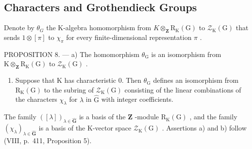 \subsection{Characters and Grothendieck Groups}

Denote by \(\theta_{G}\) the K-algebra homomorphism from \(K\otimes_{\mathbf{Z}}\mathrm{R}_{\mathrm{K}}(\mathrm{G})\) to \(\mathcal{Z}_{\mathrm{K}}(\mathrm{G})\) that sends \(1\otimes[\pi]\) to \(\chi_{\pi}\) for every finite-dimensional representation \(\pi\) .

PROPOSITION 8. --- a) The homomorphism \(\theta_{\mathrm{G}}\) is an isomorphism from \(\mathrm{K} \otimes_{\mathbf{Z}} \mathrm{R}_{\mathrm{K}}(\mathrm{G})\) to \(\mathcal{Z}_{\mathrm{K}}(\mathrm{G})\) .

\begin{enumerate}
\def\labelenumi{\alph{enumi})}
\setcounter{enumi}{1}
\tightlist
\item
  Suppose that K has characteristic 0. Then \(\theta_{\mathrm{G}}\) defines an isomorphism from \(\mathrm{R}_{\mathrm{K}}(\mathrm{G})\) to the subring of \(\mathcal{Z}_{\mathrm{K}}(\mathrm{G})\) consisting of the linear combinations of the characters \(\chi_{\lambda}\) for \(\lambda\) in \(\widehat{\mathrm{G}}\) with integer coefficients.
\end{enumerate}

The family \(([\lambda])_{\lambda \in \widehat{\mathbf{G}}}\) is a basis of the \(\mathbf{Z}\) -module \(\mathrm{R}_{\mathrm{K}}(\mathrm{G})\) , and the family \((\chi_{\lambda})_{\lambda \in \widehat{\mathbf{G}}}\) is a basis of the K-vector space \(\mathcal{Z}_{\mathrm{K}}(\mathrm{G})\) . Assertions a) and b) follow (VIII, p.~411, Proposition 5).

